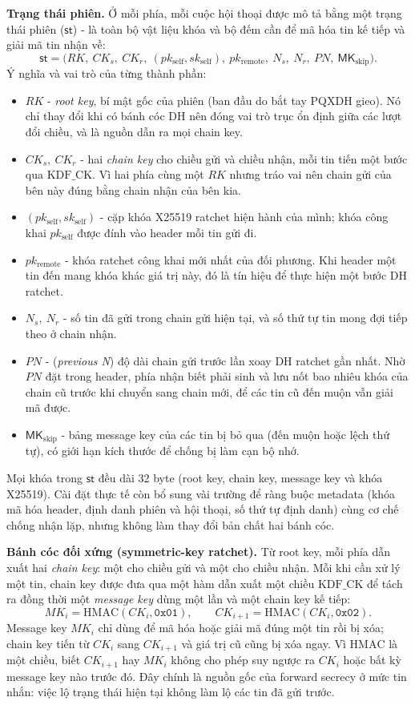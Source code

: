 \textbf{Trạng thái phiên.} Ở mỗi phía, mỗi cuộc hội thoại được mô tả bằng một trạng thái phiên  ($\mathsf{st}$) - là toàn bộ vật liệu khóa và bộ đếm cần để mã hóa tin kế tiếp và giải mã tin nhận về:
\[
  \mathsf{st} = \bigl(RK,\ CK_s,\ CK_r,\ (pk_{\text{self}}, sk_{\text{self}}),\ pk_{\text{remote}},\ N_s,\ N_r,\ PN,\ \mathsf{MK}_{\text{skip}}\bigr).
\]
Ý nghĩa và vai trò của từng thành phần:
\begin{itemize}
  \item $RK$ - \emph{root key}, bí mật gốc của phiên (ban đầu do bắt tay PQXDH gieo). Nó chỉ thay đổi khi có bánh cóc DH nên đóng vai trò trục ổn định giữa các lượt đổi chiều, và là nguồn dẫn ra mọi chain key.
  \item $CK_s,\ CK_r$ - hai \emph{chain key} cho chiều gửi và chiều nhận, mỗi tin tiến một bước qua $\mathrm{KDF\_CK}$. Vì hai phía cùng một $RK$ nhưng tráo vai nên chain gửi của bên này đúng bằng chain nhận của bên kia.
  \item $(pk_{\text{self}}, sk_{\text{self}})$ - cặp khóa X25519 ratchet hiện hành của mình; khóa công khai $pk_{\text{self}}$ được đính vào header mỗi tin gửi đi.
  \item $pk_{\text{remote}}$ - khóa ratchet công khai mới nhất của đối phương. Khi header một tin đến mang khóa khác giá trị này, đó là tín hiệu để thực hiện một bước DH ratchet.
  \item $N_s,\ N_r$ - số tin đã gửi trong chain gửi hiện tại, và số thứ tự tin mong đợi tiếp theo ở chain nhận.
  \item $PN$ - (\emph{previous N}) độ dài chain gửi trước lần xoay DH ratchet gần nhất. Nhờ $PN$ đặt trong header, phía nhận biết phải sinh và lưu nốt bao nhiêu khóa của chain cũ trước khi chuyển sang chain mới, để các tin cũ đến muộn vẫn giải mã được.
  \item $\mathsf{MK}_{\text{skip}}$ - bảng message key của các tin bị bỏ qua (đến muộn hoặc lệch thứ tự), có giới hạn kích thước để chống bị làm cạn bộ nhớ.
\end{itemize}
Mọi khóa trong $\mathsf{st}$ đều dài 32 byte (root key, chain key, message key và khóa X25519). Cài đặt thực tế còn bổ sung vài trường để ràng buộc metadata (khóa mã hóa header, định danh phiên và hội thoại, số thứ tự định danh) cùng cơ chế chống nhận lặp, nhưng không làm thay đổi bản chất hai bánh cóc.

\textbf{Bánh cóc đối xứng (symmetric-key ratchet).} Từ root key, mỗi phía dẫn xuất hai \emph{chain key}: một cho chiều gửi và một cho chiều nhận. Mỗi khi cần xử lý một tin, chain key được đưa qua một hàm dẫn xuất một chiều $\mathrm{KDF\_CK}$ để tách ra đồng thời một \emph{message key} dùng một lần và một chain key kế tiếp:
\[
  MK_i = \mathrm{HMAC}(CK_i, \texttt{0x01}), \qquad
  CK_{i+1} = \mathrm{HMAC}(CK_i, \texttt{0x02}).
\]
Message key $MK_i$ chỉ dùng để mã hóa hoặc giải mã đúng một tin rồi bị xóa; chain key tiến từ $CK_i$ sang $CK_{i+1}$ và giá trị cũ cũng bị xóa ngay. Vì $\mathrm{HMAC}$ là một chiều, biết $CK_{i+1}$ hay $MK_i$ không cho phép suy ngược ra $CK_i$ hoặc bất kỳ message key nào trước đó. Đây chính là nguồn gốc của forward secrecy ở mức tin nhắn: việc lộ trạng thái hiện tại không làm lộ các tin đã gửi trước.


